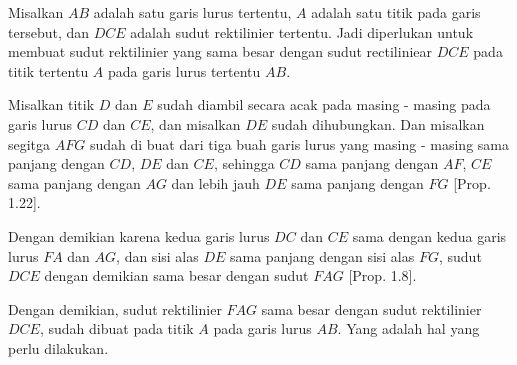 \documentclass[a4paper]{book}
\begin{document}
\begin{center}
\end{center}

Misalkan $AB$ adalah satu garis lurus tertentu, $A$ adalah satu titik pada 
garis tersebut, dan $DCE$ adalah sudut rektilinier tertentu. Jadi diperlukan
untuk membuat sudut rektilinier yang sama besar dengan sudut rectiliniear
$DCE$ pada titik tertentu $A$ pada garis lurus tertentu $AB$.

Misalkan titik $D$ dan $E$ sudah diambil secara acak pada masing - masing
pada garis lurus $CD$ dan $CE$, dan misalkan $DE$ sudah dihubungkan. 
Dan misalkan segitga $AFG$ sudah di buat dari tiga buah garis lurus yang 
masing - masing sama panjang dengan $CD$, $DE$ dan $CE$, sehingga $CD$ sama
panjang dengan $AF$, $CE$ sama panjang dengan $AG$ dan lebih jauh $DE$ 
sama panjang dengan $FG$ [Prop. 1.22].

Dengan demikian karena kedua garis lurus $DC$ dan $CE$ sama dengan kedua
garis lurus $FA$ dan $AG$, dan sisi alas $DE$ sama panjang dengan sisi
alas $FG$, sudut $DCE$ dengan demikian sama besar dengan 
sudut $FAG$ [Prop. 1.8].

Dengan demikian, sudut rektilinier $FAG$ sama besar dengan sudut rektilinier
$DCE$, sudah dibuat pada titik $A$ pada garis lurus $AB$. Yang adalah hal
yang perlu dilakukan.

\end{document}
